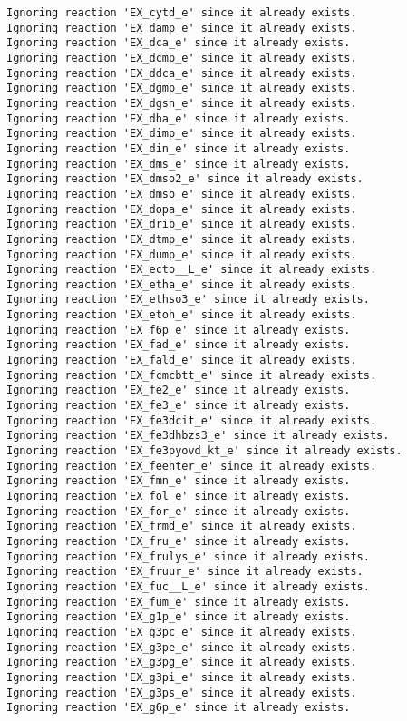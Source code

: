 \documentclass[
  letterpaper,
  DIV=11,
  numbers=noendperiod]{scrartcl}
\begin{document}
\begin{verbatim}
Ignoring reaction 'EX_cytd_e' since it already exists.
Ignoring reaction 'EX_damp_e' since it already exists.
Ignoring reaction 'EX_dca_e' since it already exists.
Ignoring reaction 'EX_dcmp_e' since it already exists.
Ignoring reaction 'EX_ddca_e' since it already exists.
Ignoring reaction 'EX_dgmp_e' since it already exists.
Ignoring reaction 'EX_dgsn_e' since it already exists.
Ignoring reaction 'EX_dha_e' since it already exists.
Ignoring reaction 'EX_dimp_e' since it already exists.
Ignoring reaction 'EX_din_e' since it already exists.
Ignoring reaction 'EX_dms_e' since it already exists.
Ignoring reaction 'EX_dmso2_e' since it already exists.
Ignoring reaction 'EX_dmso_e' since it already exists.
Ignoring reaction 'EX_dopa_e' since it already exists.
Ignoring reaction 'EX_drib_e' since it already exists.
Ignoring reaction 'EX_dtmp_e' since it already exists.
Ignoring reaction 'EX_dump_e' since it already exists.
Ignoring reaction 'EX_ecto__L_e' since it already exists.
Ignoring reaction 'EX_etha_e' since it already exists.
Ignoring reaction 'EX_ethso3_e' since it already exists.
Ignoring reaction 'EX_etoh_e' since it already exists.
Ignoring reaction 'EX_f6p_e' since it already exists.
Ignoring reaction 'EX_fad_e' since it already exists.
Ignoring reaction 'EX_fald_e' since it already exists.
Ignoring reaction 'EX_fcmcbtt_e' since it already exists.
Ignoring reaction 'EX_fe2_e' since it already exists.
Ignoring reaction 'EX_fe3_e' since it already exists.
Ignoring reaction 'EX_fe3dcit_e' since it already exists.
Ignoring reaction 'EX_fe3dhbzs3_e' since it already exists.
Ignoring reaction 'EX_fe3pyovd_kt_e' since it already exists.
Ignoring reaction 'EX_feenter_e' since it already exists.
Ignoring reaction 'EX_fmn_e' since it already exists.
Ignoring reaction 'EX_fol_e' since it already exists.
Ignoring reaction 'EX_for_e' since it already exists.
Ignoring reaction 'EX_frmd_e' since it already exists.
Ignoring reaction 'EX_fru_e' since it already exists.
Ignoring reaction 'EX_frulys_e' since it already exists.
Ignoring reaction 'EX_fruur_e' since it already exists.
Ignoring reaction 'EX_fuc__L_e' since it already exists.
Ignoring reaction 'EX_fum_e' since it already exists.
Ignoring reaction 'EX_g1p_e' since it already exists.
Ignoring reaction 'EX_g3pc_e' since it already exists.
Ignoring reaction 'EX_g3pe_e' since it already exists.
Ignoring reaction 'EX_g3pg_e' since it already exists.
Ignoring reaction 'EX_g3pi_e' since it already exists.
Ignoring reaction 'EX_g3ps_e' since it already exists.
Ignoring reaction 'EX_g6p_e' since it already exists.

\end{verbatim}
\end{document}
